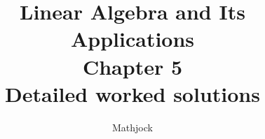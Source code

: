 
\title{\textbf{Linear Algebra and Its Applications}\\[0.3em]Chapter 5\\[0.3em]\large Detailed worked solutions}
\author{Mathjock}
\date{}

\maketitle
\bookinfo
\tableofcontents
\clearpage
\renewcommand{\thesection}{5.\arabic{section}}
\renewcommand{\theHsection}{5.\arabic{section}}
\setcounter{section}{0}

\clearpage
\renewcommand{\thesection}{5.\arabic{section}}
\renewcommand{\theHsection}{5.\arabic{section}}
\setcounter{section}{1}

\clearpage
\renewcommand{\thesection}{5.\arabic{section}}
\renewcommand{\theHsection}{5.\arabic{section}}
\setcounter{section}{2}

\clearpage
\renewcommand{\thesection}{5.\arabic{section}}
\renewcommand{\theHsection}{5.\arabic{section}}
\setcounter{section}{3}

\clearpage
\renewcommand{\thesection}{5.\arabic{section}}
\renewcommand{\theHsection}{5.\arabic{section}}
\setcounter{section}{4}

\clearpage
\renewcommand{\thesection}{5.\arabic{section}}
\renewcommand{\theHsection}{5.\arabic{section}}
\setcounter{section}{5}

\clearpage
\renewcommand{\thesection}{5.\arabic{section}}
\renewcommand{\theHsection}{5.\arabic{section}}
\setcounter{section}{6}

\clearpage
\renewcommand{\thesection}{5.\arabic{section}}
\renewcommand{\theHsection}{5.\arabic{section}}
\setcounter{section}{7}

\clearpage
\renewcommand{\thesection}{5.S}
\renewcommand{\theHsection}{5.S}
\setcounter{section}{0}


